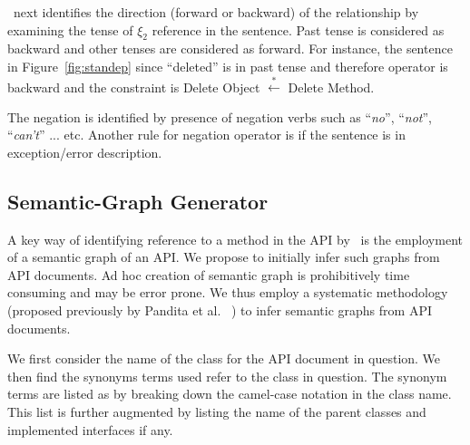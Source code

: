 \tool\ next identifies the direction (forward or backward) of the relationship by examining the tense of $\xi_2$ reference in the sentence. Past tense is considered as backward and other tenses are considered as forward. For instance, the sentence in Figure~\ref{fig:standep} since ``deleted'' is in past tense and therefore operator is backward and the constraint is 
Delete Object $\xleftarrow{*}$ Delete Method.

The negation is identified by presence of negation verbs such as ``\textit{no}'', ``\textit{not}'', ``\textit{can't}'' ... etc. Another rule for negation operator is if the sentence is in exception/error description. 



\subsection{Semantic-Graph Generator}
\label{sub:ACA}

A key way of identifying reference to a method in the API by \tool\ is the employment of a semantic graph of an API.
We propose to initially infer such graphs from API documents.
Ad hoc creation of semantic graph is prohibitively time consuming and may be error prone.
We thus employ a systematic methodology (proposed previously by Pandita et al. ~\cite{pandita13:WHYPER}) to infer semantic graphs from API documents.

We first consider the name of the class for the API document in question.
We then find the synonyms terms used refer to the class in question.
The synonym terms are listed as by breaking down the camel-case notation in the class name.
This list is further augmented by listing the name of the parent classes and implemented interfaces if any. 

